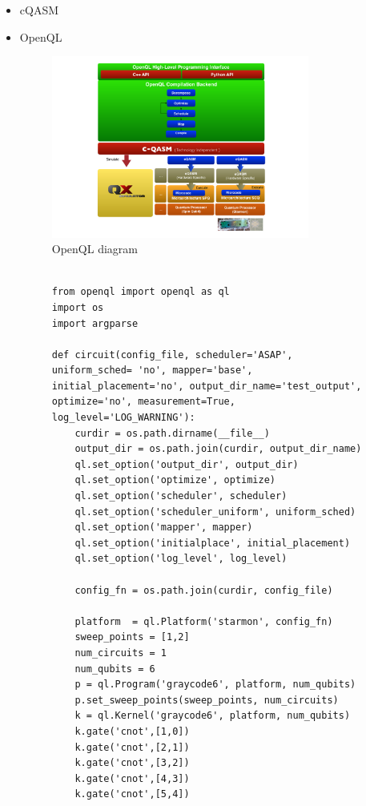\begin{itemize}
\item cQASM
\label{sec:org56437d1}


\item OpenQL
\label{sec:orgd1cee71}

\begin{figure}[htbp]
\centering
\includegraphics[width=0.8\textwidth]{figures/openql.png}
\caption{\label{fig:orgd9c489d}
OpenQL diagram}
\end{figure}

\begin{figure}
\centering
\begin{minipage}{\textwidth}

\begin{verbatim}

from openql import openql as ql
import os
import argparse

def circuit(config_file, scheduler='ASAP', uniform_sched= 'no', mapper='base', initial_placement='no', output_dir_name='test_output', optimize='no', measurement=True, log_level='LOG_WARNING'):
    curdir = os.path.dirname(__file__)
    output_dir = os.path.join(curdir, output_dir_name)
    ql.set_option('output_dir', output_dir)
    ql.set_option('optimize', optimize)
    ql.set_option('scheduler', scheduler)
    ql.set_option('scheduler_uniform', uniform_sched)
    ql.set_option('mapper', mapper)
    ql.set_option('initialplace', initial_placement)
    ql.set_option('log_level', log_level)

    config_fn = os.path.join(curdir, config_file)

    platform  = ql.Platform('starmon', config_fn)
    sweep_points = [1,2]
    num_circuits = 1
    num_qubits = 6
    p = ql.Program('graycode6', platform, num_qubits)
    p.set_sweep_points(sweep_points, num_circuits)
    k = ql.Kernel('graycode6', platform, num_qubits)
    k.gate('cnot',[1,0])
    k.gate('cnot',[2,1])
    k.gate('cnot',[3,2])
    k.gate('cnot',[4,3])
    k.gate('cnot',[5,4])


\end{verbatim}
\end{minipage}
\end{figure}
\end{itemize}
